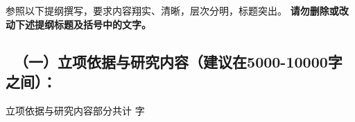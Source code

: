{\sihao \kaishu 参照以下提纲撰写，要求内容翔实、清晰，层次分明，标题突出。{\color{MsBlue} \bfseries 请勿删除或改动下述提纲标题及括号中的文字。}}
\vskip -5mm
{\color{MsBlue} \subsection{\texorpdfstring{\sihao \kaishu \quad \ （一）立项依据与研究内容（建议在5000-10000字之间）： }{（一）立项依据与研究内容（建议在5000-10000字之间）：}}}




% 



% 



% 



% 



% 



\ifhandout
\else
\begin{center}
{\larger[2]\color{red}  立项依据与研究内容部分共计 \wordcount 字 }
\end{center}
\fi
